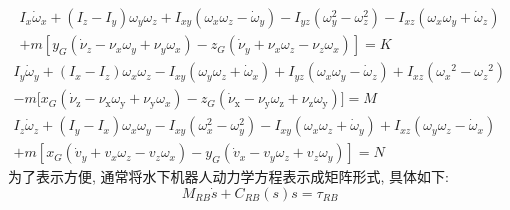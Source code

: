 \begin{equation}
    \begin{aligned}
        I_{x}\dot{\omega}_{x}+\left(I_{z}-I_{y}\right)\omega_{y}\omega_{z}+I_{xy}(\omega_{x}\omega_{z}-\dot{\omega}_{y})-I_{yz}(\omega_{y}^{2}-\omega_{z}^{2})-I_{xz}(\omega_{x}\omega_{y}+\dot{\omega}_{z})
        \\+m[y_G(\dot{\nu}_z-\nu_x\omega_y+\nu_y\omega_x)-z_G(\dot{\nu}_y+\nu_x\omega_z-\nu_z\omega_x)]=K
    \end{aligned}
\end{equation}
\begin{equation}
    \begin{aligned}
        I_{y}\dot{\omega}_{y}+(I_{x}-I_{z})\omega_{x}\omega_{z}-I_{xy}(\omega_{y}\omega_{z}+\dot{\omega}_{x})+I_{yz}(\omega_{x}\omega_{y}-\dot{\omega}_{z})+I_{xz}(\omega_{x}{}^{2}-\omega_{z}{}^{2})
        &\\-m\big[x_G(\dot{\nu}_\mathrm{z}-\nu_\mathrm{x}\omega_\mathrm{y}+\nu_\mathrm{y}\omega_x)-z_G(\dot{\nu}_\mathrm{x}-\nu_\mathrm{y}\omega_\mathrm{z}+\nu_\mathrm{z}\omega_\mathrm{y})\big]=M
\end{aligned}
\end{equation}
\begin{equation}
    \begin{aligned}
        I_{z}\dot{\omega}_{z}+\left(I_{y}-I_{x}\right)\omega_{x}\omega_{y}-I_{xy}\left(\omega_{x}^{2}-\omega_{y}^{2}\right)
        -I_{xy}(\omega_{x}\omega_{z}+\dot{\omega}_{y})+I_{xz}(\omega_{y}\omega_{z}-\dot{\omega}_{x})
        &\\+m[x_G(\dot{v}_y+v_x\omega_z-v_z\omega_x)-y_G(\dot{v}_x-v_y\omega_z+v_z\omega_y)]=
        N\end{aligned}
\end{equation}
为了表示方便, 通常将水下机器人动力学方程表示成矩阵形式, 具体如下:
\begin{equation}
    M_{{RB}}\dot{s}+C_{{RB}}(s)s=\tau_{{RB}}
\end{equation}


